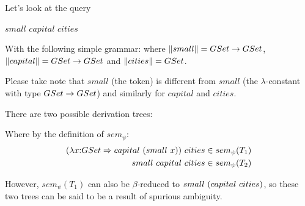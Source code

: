 \documentclass[main.tex]{subfiles}
\begin{document}
\begin{example}
    Let's look at the query
    \begin{center}
        $small$ $capital$ $cities$
    \end{center}

    With the following simple grammar:
    where $\|small\| = GSet \rightarrow GSet$, $\|capital\| = GSet \rightarrow GSet$
    and $\|cities\| = GSet$.

    Please take note that $small$ (the token) is different from $small$ (the
    $\lambda$-constant with type $GSet \rightarrow GSet$) and similarly for
    $capital$ and $cities$.

    There are two possible derivation trees:
    \begin{center}
    \end{center}
    Where by the definition of $sem_\psi$:
    \begin{align*}
        (\lambda x {:} GSet \Rightarrow capital \text{ } (small \text{ } x))
            \text{ } cities & \in sem_{\psi}(T_1) \\
        small \text{ } capital \text{ } cities & \in sem_\psi(T_2) \\
    \end{align*}

    However, $sem_\psi(T_1)$ can also be $\beta$-reduced to
    $small \text{ } (capital \text{ } cities)$, so these two trees can be said to
    be a result of spurious ambiguity.
\end{example}
\end{document}
